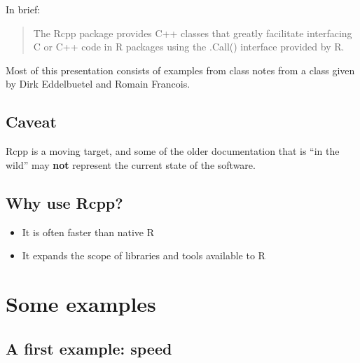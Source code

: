 \documentclass[11pt]{article}
\begin{document}
In brief:

\begin{quote}

The Rcpp package provides C++ classes that greatly facilitate
interfacing C or C++ code in R packages using the .Call() interface
provided by R. 

\end{quote}

Most of this presentation consists of examples from class notes from a
class given by Dirk Eddelbuetel and Romain Francois.
\subsection{Caveat}
\label{sec-2-2}


Rcpp is a moving target, and some of the older documentation that is ``in the
wild'' may \textbf{not} represent the current state of the software.
\subsection{Why use Rcpp?}
\label{sec-2-3}


\begin{itemize}
\item It is often faster than native R
\item It expands the scope of libraries and tools available to R
\end{itemize}
\section{Some examples}
\label{sec-3}
\subsection{A first example: speed}
\label{sec-3-1}
\end{document}
